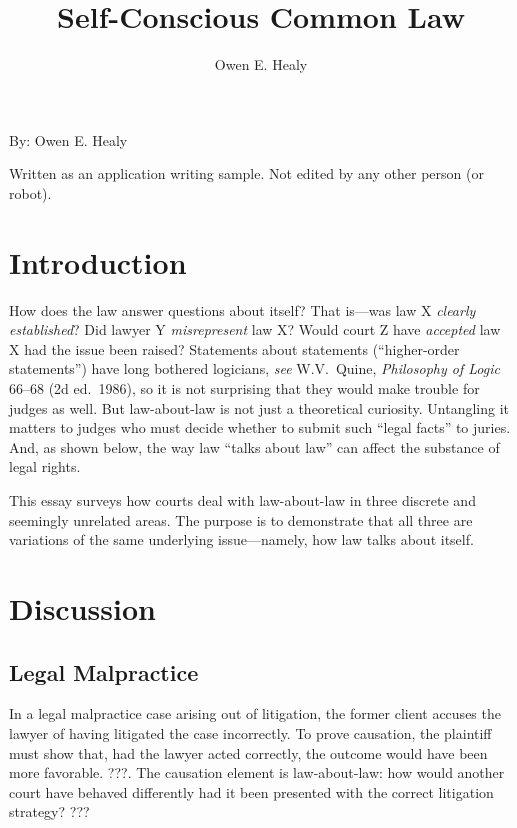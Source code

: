 \documentclass[
  12pt,
  letterpaper,
]{scrartcl}
\title{Self-Conscious Common Law}
\author{Owen E. Healy}
\begin{document}
\begin{center}\end{center}
  
\noindent\begin{minipage}{4in}
  \setlength{\parskip}{6pt}
  
  \noindent By: Owen E. Healy

  \noindent Written as an application writing sample. Not edited by any other person (or robot).
\end{minipage}


\vspace{12pt}\section{Introduction}

How does the law answer questions about itself? That is---was law X
\emph{clearly established}? Did lawyer Y \emph{misrepresent} law X? Would court
Z have \emph{accepted} law X had the issue been raised? Statements about
statements (``higher-order statements'') have long bothered logicians,
\textit{see} W.V.~Quine, \textit{Philosophy of Logic} 66--68 (2d ed.~1986), so
it is not surprising that they would make trouble for judges as well. But
law-about-law is not just a theoretical curiosity. Untangling it matters to
judges who must decide whether to submit such ``legal facts'' to juries. And,
as shown below, the way law ``talks about law'' can affect the substance of
legal rights.

This essay surveys how courts deal with law-about-law in three discrete and
seemingly unrelated areas. The purpose is to demonstrate that all three are
variations of the same underlying issue---namely, how law talks about itself.


\section{Discussion}


\subsection{Legal Malpractice}

In a legal malpractice case arising out of litigation, the former client
accuses the lawyer of having litigated the case incorrectly. To prove
causation, the plaintiff must show that, had the lawyer acted correctly, the
outcome would have been more favorable. ???. The causation element is
law-about-law: how would another court have behaved differently had it been
presented with the correct litigation strategy? ???
\end{document}
